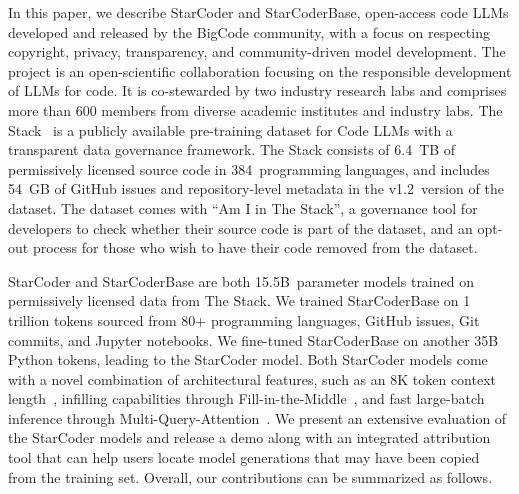\documentclass[10pt]{article} %
\begin{document}
In this paper, we describe StarCoder and StarCoderBase, open-access code LLMs developed and released by the BigCode community, with a focus on respecting copyright, privacy, transparency, and community-driven model development. The project is an open-scientific collaboration focusing on the responsible development of LLMs for code. It is co-stewarded by two industry research labs and comprises more than 600 members from diverse academic institutes and industry labs. 
The Stack~\citep{Kocetkov2022TheStack} is a publicly available pre-training dataset for Code LLMs with a transparent data governance framework. The Stack consists of 6.4~TB of permissively licensed source code in 384~programming languages, and includes 54~GB of GitHub issues and repository-level metadata in the v1.2~version of the dataset. The dataset comes with ``Am I in The Stack'', a governance tool for developers to check whether their source code is part of the dataset, and an opt-out process for those who wish to have their code removed from the dataset. 

StarCoder and StarCoderBase are both 15.5B~parameter models trained on permissively licensed data from The Stack. We trained StarCoderBase on 1 trillion tokens sourced from 80+ programming languages, GitHub issues, Git commits, and Jupyter notebooks. We fine-tuned StarCoderBase on another 35B Python tokens, leading to the StarCoder model. Both StarCoder models come with a novel combination of architectural features, such as an 8K token context length~\citep{dao2022flashattention}, infilling capabilities through Fill-in-the-Middle~\citep[FIM;][]{bavarian2022fim}, and fast large-batch inference through Multi-Query-Attention~\citep[MQA;][]{shazeer2019mqa}. We present an extensive evaluation of the StarCoder models and release a demo along with an integrated attribution tool that can help users locate model generations that may have been copied from the training set. Overall, our contributions can be summarized as follows.
\end{document}

